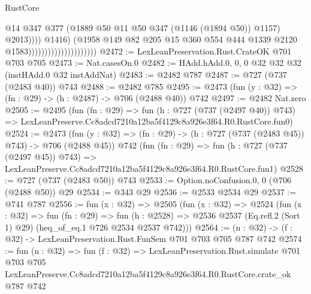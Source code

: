 \begin{lexlean}{RustCore}
\begin{coremodule}
                                                      @14
                                                      @347
                                                      @377
                                                      (@1889
                                                        @50
                                                        @11
                                                        @50
                                                        @347
                                                        (@1146 (@1894 @50))
                                                        @1157)
                                                      @2013))))
                                              @1416)
                                            (@1958
                                              @149
                                              @82
                                              @205
                                              @15
                                              @360
                                              @554
                                              @444
                                              @1339
                                              @2120
                                              @1583)))))))))))))))))))))
@2472 := LexLeanPreservation.Rust.CrateOK @701 @703 @705
@2473 := Nat.casesOn.{0}
@2482 := HAdd.hAdd.{0, 0, 0} @32 @32 @32 (instHAdd.{0} @32 instAddNat)
@2483 := @2482 @787
@2487 := @727 (@737 (@2483 @40)) @743
@2488 := @2482 @785
@2495 := @2473 (fun (y : @32) => (fn : @29) -> (h : @2487) -> @706 (@2488 @40)) @742
@2497 := @2482 Nat.zero
@2505 := @2495
    (fun (fn : @29) =>
    fun (h : @727 (@737 (@2497 @40)) @743) =>
    LexLeanPreserve.Cc8adcd7210a12ba5f4129c8a926e3f64.R0.RustCore.fun0)
@2524 := @2473
    (fun (y : @32) => (fn : @29) -> (h : @727 (@737 (@2483 @45)) @743) -> @706 (@2488 @45))
    @742
    (fun (fn : @29) =>
    fun (h : @727 (@737 (@2497 @45)) @743) =>
    LexLeanPreserve.Cc8adcd7210a12ba5f4129c8a926e3f64.R0.RustCore.fun1)
@2528 := @727 (@737 (@2483 @50)) @743
@2533 := Option.noConfusion.{0, 0} (@706 (@2488 @50)) @29
@2534 := @343 @29
@2536 := @2533 @2534 @29
@2537 := @741 @787
@2556 := fun (x : @32) =>
  @2505
    (fun (x : @32) =>
    @2524
      (fun (x : @32) =>
      fun (fn : @29) =>
      fun (h : @2528) =>
      @2536 @2537 (Eq.refl.{2} (Sort 1) @29) (heq_of_eq.{1} @726 @2534 @2537 @742)))
@2564 := (n : @32) -> (f : @32) -> LexLeanPreservation.Rust.FunSem @701 @703 @705 @787 @742
@2574 := fun (n : @32) =>
  fun (f : @32) =>
  LexLeanPreservation.Rust.simulate
    @701
    @703
    @705
    LexLeanPreserve.Cc8adcd7210a12ba5f4129c8a926e3f64.R0.RustCore.crate_ok
    @787
    @742
\end{coremodule}
\end{lexlean}
